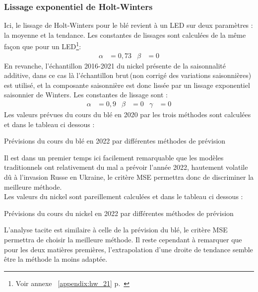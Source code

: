 \subsubsection*{Lissage exponentiel de Holt-Winters}
Ici, le lissage de Holt-Winters pour le blé revient à un LED sur deux paramètres : la moyenne et la tendance. Les constantes de lissages sont calculées de la même façon que
pour un LED\footnote{Voir annexe ~\ref{appendix:hw_21} p.~\pageref{appendix:hw_21}}: 
\begin{align*}
    \alpha &= 0,73 & \beta &= 0
\end{align*}
En revanche, l'échantillon 2016-2021 du nickel présente de la saisonnalité additive, dans ce cas là l'échantillon \guillemotleft brut\guillemotright \,(non corrigé des 
variations saisonnières) est utilisé, et la composante saisonnière est donc lissée par un lissage exponentiel saisonnier de Winters. Les constantes de lissage sont :
\begin{align*}
    \alpha &= 0,9 & \beta &= 0 & \gamma &= 0
\end{align*}
Les valeurs prévues du cours du blé en 2020 par les trois méthodes sont calculées et dans le tableau ci dessous :
\begin{table}[H]
    \centering
    \caption{Prévisions du cours du blé en 2022 par différentes méthodes de prévision}
    \sffamily
    
\end{table}
Il est dans un premier temps ici facilement remarquable que les modèles traditionnels ont relativement du mal a prévoir l'année 2022, hautement volatile dû à l'invasion 
Russe en Ukraine, le critère MSE permettra donc de discriminer la meilleure méthode. \\[11pt]
Les valeurs du nickel sont pareillement calculées et dans le tableau ci dessous :
\begin{table}[H]
    \centering
    \caption{Prévisions du cours du nickel en 2022 par différentes méthodes de prévision}
    \sffamily
    
\end{table}
L'analyse tacite est similaire à celle de la prévision du blé, le critère MSE permettra de choisir la meilleure méthode. Il reste cependant à remarquer que pour les deux 
matières premières, l'extrapolation d'une droite de tendance semble être la méthode la moins adaptée.
